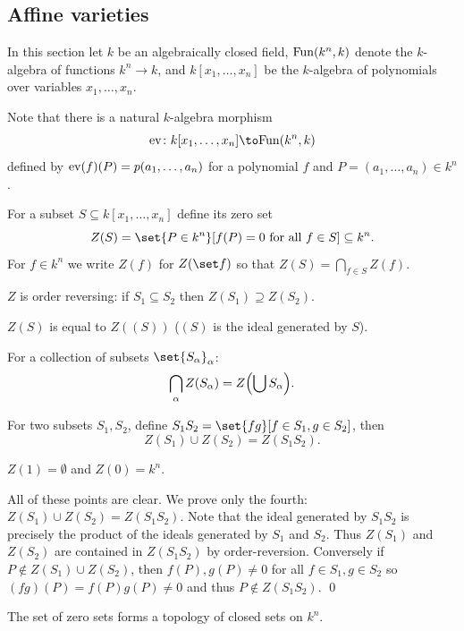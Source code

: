 \subsection{Affine varieties}

In this section let $k$ be an algebraically closed field, ${\rm Fun}(k^n,k)$ denote the $k$-algebra of functions $k^n\to k$,
and $k[x_1,\dots,x_n]$ be the $k$-algebra of polynomials over variables $x_1,\dots,x_n$.

Note that there is a natural $k$-algebra morphism
$$ \ev\colon k[x_1,\dots,x_n] \to \fun(k^n,k) $$
defined by ${\rm ev}(f)(P)=p(a_1,\dots,a_n)$ for a polynomial $f$ and $P=(a_1,\dots,a_n)\in k^n$.

For a subset $S\subseteq k[x_1,\dots,x_n]$ define its {\emphcolor zero set}
$$ Z(S) = \set{P\in k^n}[f(P)=0\hbox{ for all $f\in S$}] \subseteq k^n . $$
For $f\in k^n$ we write $Z(f)$ for $Z(\set f)$ so that $Z(S)=\bigcap_{f\in S}Z(f)$.

\blemm

    \benum
        \item $Z$ is order reversing: if $S_1\subseteq S_2$ then $Z(S_1)\supseteq Z(S_2)$.
        \item $Z(S)$ is equal to $Z((S))$ ($(S)$ is the ideal generated by $S$).
        \item For a collection of subsets $\set{S_\alpha}_\alpha$:
        $$ \bigcap_\alpha Z(S_\alpha) = Z\mathopen{}\mathclose{\left(\bigcup S_\alpha\right)} . $$
        \item For two subsets $S_1,S_2$, define $S_1S_2=\set{fg}[f\in S_1,g\in S_2]$, then
        $$ Z(S_1) \cup Z(S_2) = Z(S_1S_2) . $$
        \item $Z(1)=\emptyset$ and $Z(0)=k^n$.
    \eenum

\elemm

\bproof

    All of these points are clear.
    We prove only the fourth: $Z(S_1)\cup Z(S_2)=Z(S_1S_2)$.
    Note that the ideal generated by $S_1S_2$ is precisely the product of the ideals generated by $S_1$ and $S_2$.
    Thus $Z(S_1)$ and $Z(S_2)$ are contained in $Z(S_1S_2)$ by order-reversion.
    Conversely if $P\notin Z(S_1)\cup Z(S_2)$, then $f(P),g(P)\neq0$ for all $f\in S_1,g\in S_2$ so $(fg)(P)=f(P)g(P)\neq0$
    and thus $P\notin Z(S_1S_2)$.
    \qed

\eproof

\bcoro

    The set of zero sets forms a topology of closed sets on $k^n$.

\ecoro

